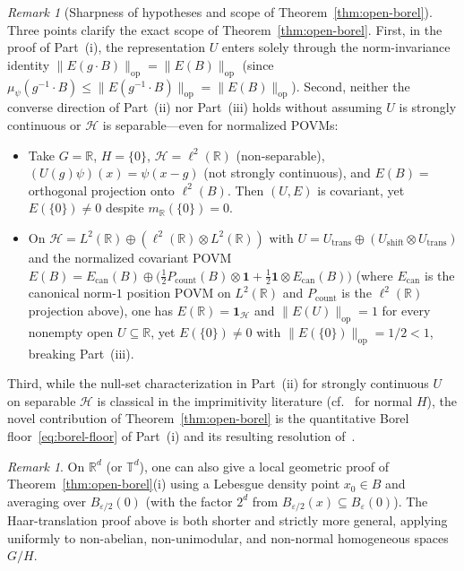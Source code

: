 \documentclass[11pt,a4paper]{article}
\theoremstyle{definition}
\theoremstyle{remark}
\newtheorem{remark}[theorem]{Remark}
\newcommand{\HH}{\mathcal{H}}
\newcommand{\RR}{\mathbb{R}}
\newcommand{\TT}{\mathbb{T}}
\newcommand{\op}{\mathrm{op}}
\newcommand{\one}{\mathbf{1}}
\newcommand{\norm}[1]{\|#1\|}
\begin{document}
\begin{remark}[Sharpness of hypotheses and scope of Theorem~\ref{thm:open-borel}]\label{rem:open-borel-sharp}
Three points clarify the exact scope of Theorem~\ref{thm:open-borel}. First, in the proof of Part~(i), the representation $U$ enters solely through the norm-invariance identity $\norm{E(g\cdot B)}_{\op}=\norm{E(B)}_{\op}$ (since $\mu_\psi(g^{-1}\cdot B)\le\norm{E(g^{-1}\cdot B)}_{\op}=\norm{E(B)}_{\op}$). Second, neither the converse direction of Part~(ii) nor Part~(iii) holds without assuming $U$ is strongly continuous or $\HH$ is separable---even for normalized POVMs:
\begin{itemize}[leftmargin=*,nosep]
\item Take $G=\RR$, $H=\{0\}$, $\HH=\ell^2(\RR)$ (non-separable), $(U(g)\psi)(x)=\psi(x-g)$ (not strongly continuous), and $E(B)=$ orthogonal projection onto $\ell^2(B)$. Then $(U,E)$ is covariant, yet $E(\{0\})\neq 0$ despite $m_\RR(\{0\})=0$.
\item On $\HH = L^2(\RR)\oplus(\ell^2(\RR)\otimes L^2(\RR))$ with $U = U_{\mathrm{trans}}\oplus(U_{\mathrm{shift}}\otimes U_{\mathrm{trans}})$ and the normalized covariant POVM $E(B) = E_{\mathrm{can}}(B)\oplus\bigl(\frac{1}{2}P_{\mathrm{count}}(B)\otimes\one + \frac{1}{2}\one\otimes E_{\mathrm{can}}(B)\bigr)$ (where $E_{\mathrm{can}}$ is the canonical norm-$1$ position POVM on $L^2(\RR)$ and $P_{\mathrm{count}}$ is the $\ell^2(\RR)$ projection above), one has $E(\RR)=\one_\HH$ and $\norm{E(U)}_{\op}=1$ for every nonempty open $U\subseteq\RR$, yet $E(\{0\})\neq 0$ with $\norm{E(\{0\})}_{\op}=1/2 < 1$, breaking Part~(iii).
\end{itemize}
Third, while the null-set characterization in Part~(ii) for strongly continuous $U$ on separable $\HH$ is classical in the imprimitivity literature (cf.~\cite[Prop.~8]{Heinonen2003} for normal $H$), the novel contribution of Theorem~\ref{thm:open-borel} is the quantitative Borel floor~\eqref{eq:borel-floor} of Part~(i) and its resulting resolution of~\cite[Sec.~5.1]{Heinonen2003}.
\end{remark}

\begin{remark}\label{rem:rd-lebesgue}
On $\RR^d$ (or $\TT^d$), one can also give a local geometric proof of Theorem~\ref{thm:open-borel}(i) using a Lebesgue density point $x_0\in B$ and averaging over $B_{\varepsilon/2}(0)$ (with the factor $2^d$ from $B_{\varepsilon/2}(x)\subseteq B_\varepsilon(0)$). The Haar-translation proof above is both shorter and strictly more general, applying uniformly to non-abelian, non-unimodular, and non-normal homogeneous spaces $G/H$.
\end{remark}
\end{document}
